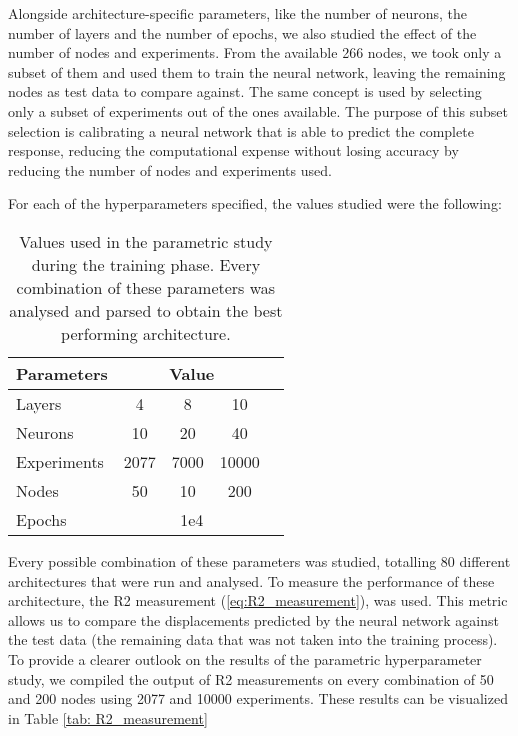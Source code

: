 Alongside architecture-specific parameters, like the number of neurons, the number of layers and the number of epochs, we also studied the effect of the number of nodes and experiments. From the available 266 nodes, we took only a subset of them and used them to train the neural network, leaving the remaining nodes as test data to compare against. The same concept is used by selecting only a subset of experiments out of the ones available. The purpose of this subset selection is calibrating a neural network that is able to predict the complete response, reducing the computational expense without losing accuracy by reducing the number of nodes and experiments used. 

For each of the hyperparameters specified, the values studied were the following:

\begin{table}[!hb]
  \centering
\begin{tabular}{l|cccc}
\textbf{Parameters} & \multicolumn{3}{c}{\textbf{Value}} \\ \hline
Layers              & 4      & 8       & 10            \\
Neurons             & 10     & 20      & 40           \\
Experiments         & 2077    & 7000    & 10000      \\
Nodes               & 50     & 10      & 200           \\
Epochs              &  \multicolumn{3}{c}{1e4}        
\end{tabular}
  \caption{Values used in the parametric study during the training phase. Every combination of these parameters was analysed and parsed to obtain the best performing architecture.}
\end{table}

Every possible combination of these parameters was studied, totalling 80 different architectures that were run and analysed. To measure the performance of these architecture, the R2 measurement (\ref{eq:R2_measurement}), was used. This metric allows us to compare the displacements predicted by the neural network against the test data (the remaining data that was not taken into the training process). To provide a clearer outlook on the results of the parametric hyperparameter study, we compiled the output of R2 measurements on every combination of 50 and 200 nodes using 2077 and 10000 experiments. These results can be visualized in Table \ref{tab: R2_measurement}





